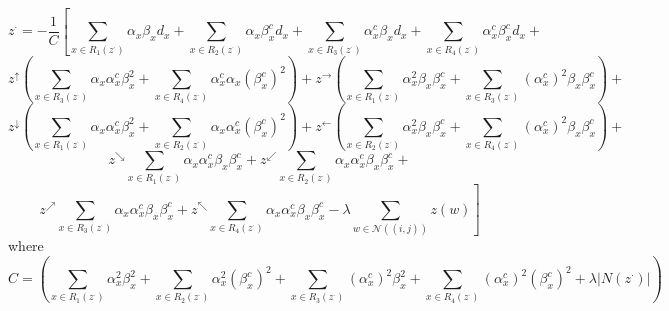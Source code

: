 \documentclass[11pt]{article}
\begin{document}
\begin{displaymath}
	z^{\cdot}=-\frac{1}{C}\left[ \sum_{x\in R_{1}(z^{\cdot})}\alpha_{x}\beta_{x}d_{x} + \sum_{x\in R_{2}(z^{\cdot})}\alpha_{x}\beta_{x}^{c}d_{x}  + \sum_{x\in R_{3}(z^{\cdot})}\alpha_{x}^{c}\beta_{x}d_{x} + \sum_{x\in
	R_{4}(z^{\cdot})}\alpha_{x}^{c}\beta_{x}^{c}d_{x}\right.+
\end{displaymath}
\begin{displaymath}
	\left.z^{\uparrow}\left(\sum_{x\in R_{3}(z^{\cdot})}\alpha_{x}\alpha_{x}^{c}\beta_{x}^{2} + \sum_{x\in R_{4}(z^{\cdot})}\alpha_{x}^{c}\alpha_{x}(\beta_{x}^{c})^{2}\right)+z^{\rightarrow}\left(\sum_{x\in R_{1}(z^{\cdot})}\alpha_{x}^{2}\beta_{x}\beta_{x}^{c} + \sum_{x\in R_{3}(z^{\cdot})}(\alpha_{x}^{c})^{2}\beta_{x}\beta_{x}^{c}\right)+\right.
\end{displaymath}
\begin{displaymath}
	\left.z^{\downarrow}\left(\sum_{x\in R_{1}(z^{\cdot})}\alpha_{x}\alpha_{x}^{c}\beta_{x}^{2} + \sum_{x\in R_{2}(z^{\cdot})}\alpha_{x}\alpha_{x}^{c}(\beta_{x}^{c})^{2}\right)+z^{\leftarrow}\left(\sum_{x\in R_{2}(z^{\cdot})}\alpha_{x}^{2}\beta_{x}\beta_{x}^{c} + \sum_{x\in R_{4}(z^{\cdot})}(\alpha_{x}^{c})^{2}\beta_{x}\beta_{x}^{c}\right)+\right.
\end{displaymath}
\begin{displaymath}
	z^{\searrow}\sum_{x\in R_{1}(z^{\cdot})}\alpha_{x}\alpha_{x}^{c}\beta_{x}\beta_{x}^{c}+ z^{\swarrow}\sum_{x\in R_{2}(z^{\cdot})}\alpha_{x}\alpha_{x}^{c}\beta_{x}\beta_{x}^{c}+
\end{displaymath}
\begin{displaymath}
	\left.z^{\nearrow}\sum_{x\in R_{3}(z^{\cdot})}\alpha_{x}\alpha_{x}^{c}\beta_{x}\beta_{x}^{c}+ z^{\nwarrow}\sum_{x\in R_{4}(z^{\cdot})}\alpha_{x}\alpha_{x}^{c}\beta_{x}\beta_{x}^{c} - \lambda \sum_{w\in\mathcal{N}((i,j))}z(w)\right]
\end{displaymath}
where
\begin{displaymath}
    C=\left( \sum_{x \in R_{1}(z^{\cdot})}\alpha_{x}^{2}\beta_{x}^{2}+\sum_{x \in R_{2}(z^{\cdot})}\alpha_{x}^{2}(\beta_{x}^{c})^{2}+\sum_{x \in R_{3}(z^{\cdot})}(\alpha_{x}^{c})^{2}\beta_{x}^{2} +\sum_{x \in R_{4}(z^{\cdot})}(\alpha_{x}^{c})^{2}(\beta_{x}^{c})^{2} + \lambda|N(z^{\cdot})|\right)
\end{displaymath}
\end{document}
